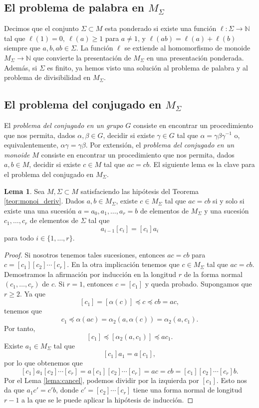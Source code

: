 \documentclass[12pt]{book}
\theoremstyle{definition}
\newtheorem{lema}{Lema}[section]
\begin{document}
\subsection{El problema de palabra en $M_\Sigma$}

Decimos que el conjunto $\Sigma\subset M$ esta ponderado si existe una función $\ell:\Sigma\rightarrow\mathbb{N}$ tal que $\ell(1)=0,\ \ell(a)\geq 1$ para $a\neq 1$, y $\ell(ab)=\ell(a)+\ell(b)$ siempre que $a,b,ab\in\Sigma$. La función $\ell$ se extiende al homomorfismo de monoide $M_\Sigma\rightarrow\mathbb{N}$ que convierte la presentación de $M_\Sigma$ en una presentación ponderada. Además, si $\Sigma$ es finito, ya hemos visto una solución al problema de palabra y al problema de divisibilidad en $M_\Sigma$.

\subsection{El problema del conjugado en $M_\Sigma$}
\label{sec:pc_msigma}
El \textit{problema del conjugado en un grupo} $G$ consiste en encontrar un procedimiento que nos permita, dados $\alpha,\beta\in G$, decidir si existe $\gamma\in G$ tal que $\alpha=\gamma\beta\gamma^{-1}$ o, equivalentemente, $\alpha\gamma=\gamma\beta$. Por extensión, el \textit{problema del conjugado en un monoide} $M$ consiste en encontrar un procedimiento que nos permita, dados $a,b\in M$, decidir si existe $c\in M$ tal que $ac=cb$. El siguiente lema es la clave para el problema del conjugado en $M_\Sigma$.

\begin{lema}
Sea $M,\Sigma\subset M$ satisfaciendo las hipótesis del Teorema \ref{teor:monoi_deriv}. Dados $a,b\in M_\Sigma$, existe $c\in M_\Sigma$ tal que $ac=cb$ si y solo si existe una una sucesión $a=a_0,a_1,\ldots,a_r=b$ de elementos de $M_\Sigma$ y una sucesión $c_1,\ldots,c_r$ de elementos de $\Sigma$ tal que
$$a_{i-1}[c_i]=[c_i]a_i$$
para todo $i\in\{1,\ldots,r\}$.

\label{lema:conjugado}
\end{lema}

\begin{proof} Si nosotros tenemos tales sucesiones, entonces $ac=cb$ para $c=[c_1][c_2]\cdots[c_r]$. En la otra implicación tenemos que $c\in M_\Sigma$ tal que $ac=cb$. Demostramos la afirmación por inducción en la longitud $r$ de la forma normal $(c_1,\ldots,c_r)$ de $c$. Si $r=1$, entonces $c = [c_1]$ y queda probado. Supongamos que $r\geq 2$. Ya que
$$[c_1]=[\alpha(c)]\preceq c \preceq cb = ac,$$
tenemos que
$$c_1\preceq\alpha(ac)=\alpha_2(a,\alpha(c))=\alpha_2(a,c_1).$$
Por tanto,
$$[c_1]\preceq [\alpha_2(a,c_1)]\preceq ac_1.$$
Existe $a_1\in M_\Sigma$ tal que
$$[c_1]a_1=a[c_1],$$
por lo que obtenemos que 
$$[c_1]a_1[c_2]\cdots[c_r]=a[c_1][c_2]\cdots[c_r]=ac=cb=[c_1][c_2]\cdots[c_r]b.$$
Por el Lema \ref{lema:cancel}, podemos dividir por la izquierda por $[c_1]$. Esto nos da que $a_1c'=c'b$, donde $c'=[c_2]\cdots[c_r]$ tiene una forma normal de longitud $r-1$ a la que se le puede aplicar la hipótesis de inducción.
\end{proof}
\end{document}
